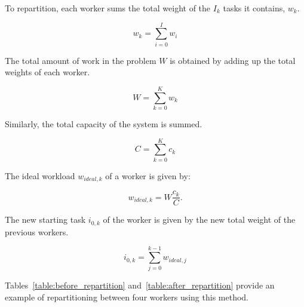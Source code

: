 To repartition, each worker sums the total weight of the \(I_k\) tasks it contains, \(w_k\).

\begin{equation}
	w_k = \sum_{i = 0}^{I}w_i
\end{equation}

\noindent
The total amount of work in the problem \(W\) is obtained by adding up the total weights of each
worker.

\begin{equation}
	W = \sum_{k = 0}^{K}w_k
\end{equation}

\noindent
Similarly, the total capacity of the system is summed.

\begin{equation}
	C = \sum_{k = 0}^{K}c_k
\end{equation}

\noindent
The ideal workload \(w_{ideal,k}\) of a worker is given by:

\begin{equation}
	w_{ideal,k} = W \frac{c_k}{C}.
\end{equation}

\noindent
The new starting task \(i_{0, k}\) of the worker is given by the new total weight of the previous
workers.

\begin{equation}
	i_{0, k} = \sum_{j = 0}^{k - 1}w_{ideal,j}
\end{equation}

Tables~\ref{table:before_repartition} and~\ref{table:after_repartition} provide an example of
repartitioning between four workers using this method.

